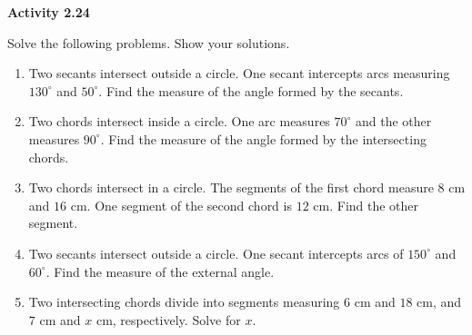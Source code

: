 \vspace{0.3ex}
\noindent\textbf{Activity 2.24}

\vspace{0.2ex}

Solve the following problems. Show your solutions.

\begin{enumerate}
    \item Two secants intersect outside a circle. One secant intercepts arcs measuring $130^\circ$ and $50^\circ$. Find the measure of the angle formed by the secants.
    \item Two chords intersect inside a circle. One arc measures $70^\circ$ and the other measures $90^\circ$. Find the measure of the angle formed by the intersecting chords.
    \item Two chords intersect in a circle. The segments of the first chord measure $8$ cm and $16$ cm. One segment of the second chord is $12$ cm. Find the other segment.
    \item Two secants intersect outside a circle. One secant intercepts arcs of $150^\circ$ and $60^\circ$. Find the measure of the external angle.
    \item Two intersecting chords divide into segments measuring $6$ cm and $18$ cm, and $7$ cm and $x$ cm, respectively. Solve for $x$.
\end{enumerate}

